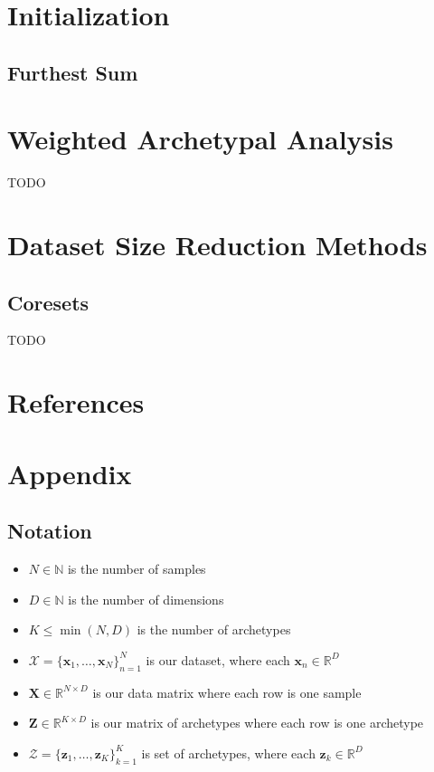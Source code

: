 \documentclass[oneside]{article}
\begin{document}
\section{Initialization}

\subsection{Furthest Sum}

\section{Weighted Archetypal Analysis}

TODO

\section{Dataset Size Reduction Methods}

\subsection{Coresets}

TODO

\section{References}

\printbibliography[heading=none]

\section{Appendix}

\subsection{Notation}

\begin{itemize}
    \item $N \in \mathbb{N}$ is the number of samples
    \item $D \in \mathbb{N}$ is the number of dimensions
    \item $K \leq \min(N, D)$ is the number of archetypes
    \item $\mathcal{X}=\{\mathbf{x}_1, \ldots, \mathbf{x}_N\}_{n=1}^N$ is our dataset, where each $\mathbf{x}_n \in \mathbb{R}^D$
    \item $\mathbf{X} \in \mathbb{R}^{N \times D}$ is our data matrix where each row is one sample
    \item $\mathbf{Z} \in \mathbb{R}^{K \times D}$ is our matrix of archetypes where each row is one archetype
    \item $\mathcal{Z}=\{\mathbf{z}_1, \ldots, \mathbf{z}_K\}_{k=1}^K$ is set of archetypes, where each $\mathbf{z}_k \in \mathbb{R}^D$
\end{itemize}
\end{document}
